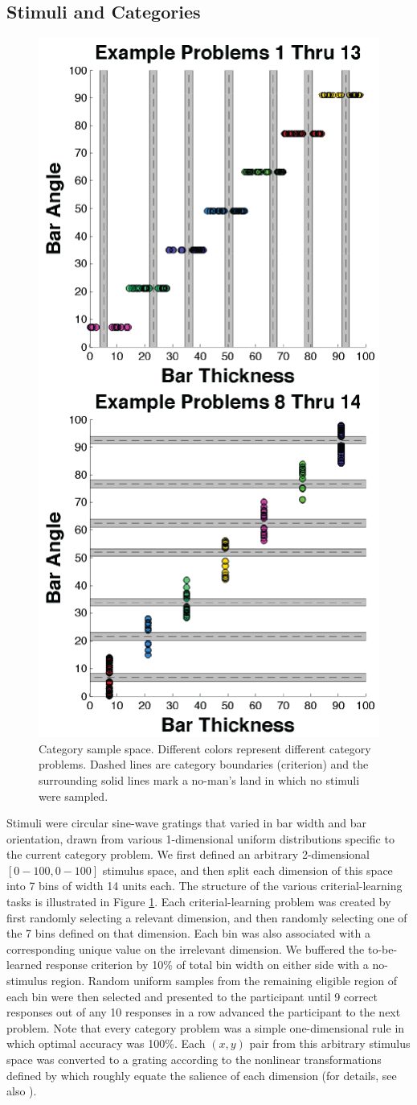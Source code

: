 \documentclass[jou,apacite]{apa6}
\begin{document}
\subsection{Stimuli and Categories}
\begin{figure}
  \centering
  \includegraphics[width=.35\textwidth]{figures/Space.png}
  \caption{Category sample space. Different colors represent different
    category problems. Dashed lines are category boundaries (criterion) and the
    surrounding solid lines mark a no-man's land in which no stimuli were sampled.}
  \label{space}
\end{figure}
Stimuli were circular sine-wave gratings that varied in bar width and bar
orientation, drawn from various 1-dimensional uniform distributions specific to
the current category problem. We first defined an arbitrary 2-dimensional
$[0-100,0-100]$ stimulus space, and then split each dimension of this space into
7 bins of width 14 units each. The structure of the various criterial-learning
tasks is illustrated in Figure \ref{space}. Each criterial-learning problem was
created by first randomly selecting a relevant dimension, and then randomly
selecting one of the 7 bins defined on that dimension. Each bin was also
associated with a corresponding unique value on the irrelevant dimension. We
buffered the to-be-learned response criterion by 10\% of total bin width on
either side with a no-stimulus region. Random uniform samples from the remaining
eligible region of each bin were then selected and presented to the participant
until 9 correct responses out of any 10 responses in a row advanced the
participant to the next problem. Note that every category problem was a simple
one-dimensional rule in which optimal accuracy was 100\%. Each $(x,y)$ pair from
this arbitrary stimulus space was converted to a grating according to the
nonlinear transformations defined by  which
roughly equate the salience of each dimension (for details, see also
).
\end{document}
